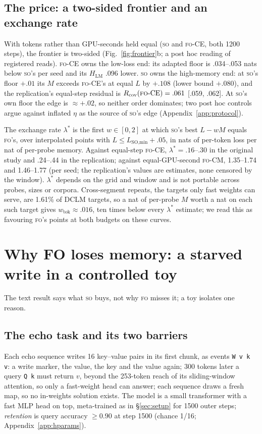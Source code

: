 \documentclass[11pt]{article}
\newcommand{\FO}{\textsc{fo}}
\newcommand{\SO}{\textsc{so}}
\newcommand{\lam}{\ensuremath{\lambda^{\ast}}}
\newcommand{\Rcov}{\ensuremath{R_{\mathrm{cov}}}}
\begin{document}
\subsection{The price: a two-sided frontier and an exchange rate}
\label{sec:price}

With tokens rather than GPU-seconds held equal (\SO{} and \FO-CE, both 1200 steps), the frontier is
two-sided (Fig.~\ref{fig:frontier}b; a post hoc reading of registered reads). \FO-CE{} owns the
low-loss end: its adapted floor is .034--.053 nats below \SO's per seed and its $H_{\text{LM}}$ .096
lower. \SO{} owns the high-memory end: at \SO's floor $+.01$ its $M$ exceeds \FO-CE's at equal $L$ by
$+.108$ (lower bound $+.080$), and the replication's equal-step residual is $\Rcov(\FO\text{-CE})=.061$
[.059, .062]. At \SO's own floor the edge is $\approx+.02$, so neither order dominates; two post hoc
controls argue against inflated $\eta$ as the source of \SO's edge (Appendix~\ref{app:protocol}).

The exchange rate $\lam$ is the first $w\in[0,2]$ at which \SO's best $L-wM$ equals \FO's, over
interpolated points with $L\le L_{\text{SO,min}}+.05$, in nats of per-token loss per nat of per-probe
memory. Against equal-step \FO-CE, $\lam=.16$--$.30$ in the original study and .24--.44 in the
replication; against equal-GPU-second \FO-CM, 1.35--1.74 and 1.46--1.77 (per seed; the replication's
values are estimates, none censored by the window). $\lam$ depends on the grid and window and is
not portable across probes, sizes or corpora. Cross-segment repeats, the targets only fast
weights can serve, are 1.61\% of DCLM targets, so a nat of per-probe $M$ worth a nat on each such
target gives $w_{\text{tok}}\approx.016$, ten times below every $\lam$ estimate; we read this as
favouring \FO's points at both budgets on these curves.

\section{Why FO loses memory: a starved write in a controlled toy}
\label{sec:toy}

The text result says what \SO{} buys, not why \FO{} misses it; a toy isolates one reason.

\subsection{The echo task and its two barriers}
\label{sec:twobarriers}

Each echo sequence writes 16 key--value pairs in its first chunk, as events \texttt{W v k v}: a write
marker, the value, the key and the value again; 300 tokens later a query \texttt{Q k} must
return $v$, beyond the 253-token reach of its sliding-window attention, so only a
fast-weight head can answer; each sequence draws a fresh map, so no in-weights solution exists. The
model is a small transformer with a fast MLP head on top, meta-trained as in
\S\ref{sec:setup} for 1500 outer steps; \emph{retention} is query accuracy $\ge0.90$ at step 1500
(chance 1/16; Appendix~\ref{app:hparams}).
\end{document}
